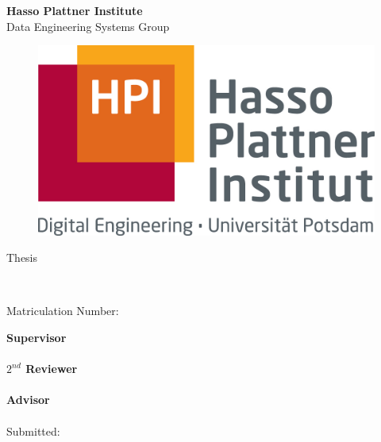 \begin{titlepage}
\begin{center}
\LARGE{\textbf{Hasso Plattner Institute}}\\
\Large{Data Engineering Systems Group}\\[0.3cm]

\begin{figure}[h!]
    \centering
    \includegraphics[width=.3\linewidth]{images/hpi_logo.jpg}
\end{figure}
\vspace{1cm}

\LARGE{{\thesisType} Thesis}\\[0.7cm]
\Huge{\textbf{\thesisTitle}}

\vspace{0.4cm}

\Large{\germanTitle}

\vspace{1cm} 

\Large{\textbf{\name}} \\[3pt]  
\vspace{0.5cm}

\large{Matriculation Number: \matriculationNumber} \\
\vspace{1cm}

\large{\textbf{Supervisor}}\\
\supervisor\\
\vspace{0.5cm}
\large{\textbf{$2^{nd}$ Reviewer}}\\
\secondReviewer\\
\vspace{0.5cm}
\textbf{Advisor}\\
\advisor\\

\vspace{1cm}
\large{Submitted: \submissionDate} \\ 

\end{center}
\end{titlepage}